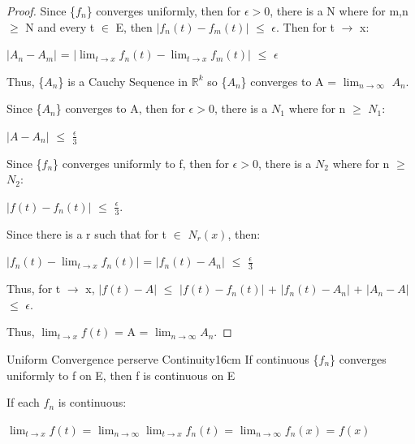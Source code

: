     \begin{proof}
        Since \{$f_n$\} converges uniformly, then for $\epsilon > 0$,
        there is a N where for m,n $\geq$ N and every t $\in$ E, then
        $|f_n(t) - f_m(t)|$ $\leq$ $\epsilon$.
        Then for t $\rightarrow$ x:

        \hspace{0.5cm}
        $|A_n - A_m|$
        = $|\lim_{t \rightarrow x} f_n(t) - \lim_{t \rightarrow x} f_m(t)|$
        $\leq$ $\epsilon$

        Thus, \{$A_n$\} is a Cauchy Sequence in $\mathbb{R}^k$ so \{$A_n$\}
        converges to A = $\lim_{n \rightarrow \infty}$ $A_n$.

        Since \{$A_n$\} converges to A, then for $\epsilon > 0$, there is a
        $N_1$ where for n $\geq$ $N_1$:

        \hspace{0.5cm}
        $|A - A_n|$ $\leq$ $\frac{\epsilon}{3}$

        Since \{$f_n$\} converges uniformly to f, then for $\epsilon > 0$,
        there is a $N_2$ where for n $\geq$ $N_2$:

        \hspace{0.5cm}
        $|f(t) - f_n(t)|$ $\leq$ $\frac{\epsilon}{3}$.

        Since there is a r such that for t $\in$ $N_r(x)$, then:

        \hspace{0.5cm}
        $|f_n(t) - \lim_{t \rightarrow x} f_n(t)|$
        = $|f_n(t) - A_n|$
        $\leq$ $\frac{\epsilon}{3}$

        Thus, for t $\rightarrow$ x, 
        $|f(t) - A|$
        $\leq$ $|f(t) - f_n(t)|$ + $|f_n(t) - A_n|$ + $|A_n - A|$
        $\leq$ $\epsilon$.

        Thus, $\lim_{t \rightarrow x} f(t)$ = A = $\lim_{n \rightarrow \infty} A_n$.
    \end{proof}

    \vspace{0.5cm}



    \begin{wtheorem}{Uniform Convergence perserve Continuity}{16cm}
        If continuous \{$f_n$\} converges uniformly to f on E,
        then f is continuous on E
    \end{wtheorem}

    \begin{intuition}
        If each $f_n$ is continuous:

        \hspace{0.5cm}
        $\lim_{t \rightarrow x} f(t)$
        = $\lim_{n \rightarrow \infty} \lim_{t \rightarrow x} f_n(t)$
        = $\lim_{n \rightarrow \infty} f_n(x)$
        = $f(x)$
    \end{intuition}

